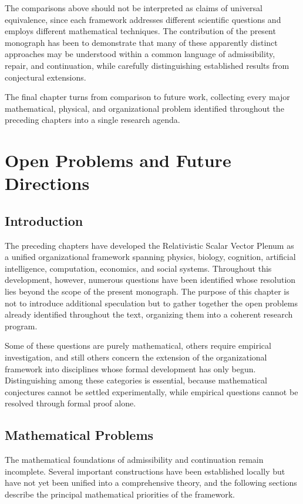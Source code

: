 \documentclass[11pt,oneside]{book}
\numberwithin{equation}{chapter}
\theoremstyle{definition}
\theoremstyle{plain}
\begin{document}
The comparisons above should not be interpreted as claims of universal equivalence, since each framework addresses different scientific questions and employs different mathematical techniques. The contribution of the present monograph has been to demonstrate that many of these apparently distinct approaches may be understood within a common language of admissibility, repair, and continuation, while carefully distinguishing established results from conjectural extensions.

The final chapter turns from comparison to future work, collecting every major mathematical, physical, and organizational problem identified throughout the preceding chapters into a single research agenda.

\chapter{Open Problems and Future Directions}

\section{Introduction}

The preceding chapters have developed the Relativistic Scalar Vector Plenum as a unified organizational framework spanning physics, biology, cognition, artificial intelligence, computation, economics, and social systems. Throughout this development, however, numerous questions have been identified whose resolution lies beyond the scope of the present monograph. The purpose of this chapter is not to introduce additional speculation but to gather together the open problems already identified throughout the text, organizing them into a coherent research program.

Some of these questions are purely mathematical, others require empirical investigation, and still others concern the extension of the organizational framework into disciplines whose formal development has only begun. Distinguishing among these categories is essential, because mathematical conjectures cannot be settled experimentally, while empirical questions cannot be resolved through formal proof alone.

\section{Mathematical Problems}

The mathematical foundations of admissibility and continuation remain incomplete. Several important constructions have been established locally but have not yet been unified into a comprehensive theory, and the following sections describe the principal mathematical priorities of the framework.
\end{document}
